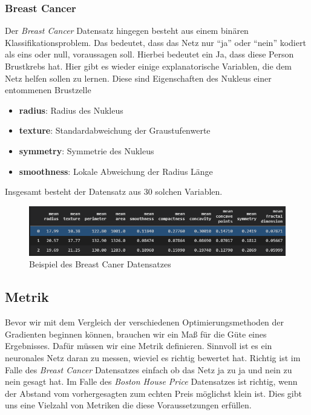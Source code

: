 \subsubsection{Breast Cancer} \label{Breast Cancer}

Der \textit{Breast Cancer} Datensatz hingegen besteht aus einem binären Klassifikationsproblem.
Das bedeutet, dass das Netz nur ``ja'' oder ``nein'' kodiert als eins oder null, voraussagen
soll. Hierbei bedeutet ein Ja, dass diese Person Brustkrebs hat. Hier gibt es 
wieder einige explanatorische Variablen, die dem Netz helfen sollen zu lernen.
Diese sind Eigenschaften des Nukleus einer entommenen Brustzelle


\begin{itemize}
    \item \textbf{radius}: Radius des Nukleus
    \item \textbf{texture}: Standardabweichung der Graustufenwerte
    \item \textbf{symmetry}: Symmetrie des Nukleus
    \item \textbf{smoothness}: Lokale Abweichung der Radius Länge
\end{itemize}

Insgesamt besteht der Datensatz aus 30 solchen Variablen.

\begin{figure}[htbp] 
    \centering
       \includegraphics[width=1.0\textwidth]{abb/BreastCancerBeispiel.PNG}
    \caption{Beispiel des Breast Caner Datensatzes}
    \label{fig:BreastCancerBeispiel}
\end{figure}

\subsection{Metrik} \label{Metrik}

Bevor wir mit dem Vergleich der verschiedenen Optimierungsmethoden der Gradienten
beginnen können, brauchen wir ein Maß für die Güte eines Ergebnisses. 
Dafür müssen wir eine Metrik definieren. Sinnvoll ist es ein neuronales Netz
daran zu messen, wieviel es richtig bewertet hat. Richtig ist im Falle des \textit{Breast Cancer}
Datensatzes einfach ob das Netz ja zu ja und nein zu nein gesagt hat. Im Falle 
des \textit{Boston House Price} Datensatzes ist richtig, wenn der Abstand vom
vorhergesagten zum echten Preis möglichst klein ist. Dies gibt uns eine 
Vielzahl von Metriken die diese Voraussetzungen erfüllen.\\


